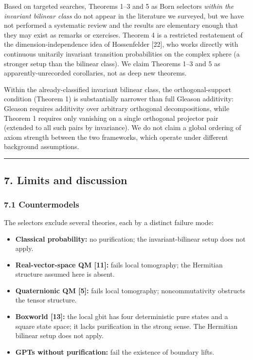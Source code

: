 \documentclass[
]{article}
\providecommand{\tightlist}{%
  \setlength{\itemsep}{0pt}\setlength{\parskip}{0pt}}
\begin{document}
Based on targeted searches, Theorems 1--3 and 5 as Born selectors
\emph{within the invariant bilinear class} do not appear in the
literature we surveyed, but we have not performed a systematic review
and the results are elementary enough that they may exist as remarks or
exercises. Theorem 4 is a restricted restatement of the
dimension-independence idea of Hossenfelder {[}22{]}, who works directly
with continuous unitarily invariant transition probabilities on the
complex sphere (a stronger setup than the bilinear class). We claim
Theorems 1--3 and 5 as apparently-unrecorded corollaries, not as deep
new theorems.

Within the already-classified invariant bilinear class, the
orthogonal-support condition (Theorem 1) is substantially narrower than
full Gleason additivity: Gleason requires additivity over arbitrary
orthogonal decompositions, while Theorem 1 requires only vanishing on a
single orthogonal projector pair (extended to all such pairs by
invariance). We do not claim a global ordering of axiom strength between
the two frameworks, which operate under different background
assumptions.

\begin{center}\rule{0.5\linewidth}{0.5pt}\end{center}

\subsection{7. Limits and discussion}\label{limits-and-discussion}

\subsubsection{7.1 Countermodels}\label{countermodels}

The selectors exclude several theories, each by a distinct failure mode:

\begin{itemize}
\tightlist
\item
  \textbf{Classical probability:} no purification; the
  invariant-bilinear setup does not apply.
\item
  \textbf{Real-vector-space QM {[}11{]}:} fails local tomography; the
  Hermitian structure assumed here is absent.
\item
  \textbf{Quaternionic QM {[}5{]}:} fails local tomography;
  noncommutativity obstructs the tensor structure.
\item
  \textbf{Boxworld {[}13{]}:} the local gbit has four deterministic pure
  states and a square state space; it lacks purification in the strong
  sense. The Hermitian bilinear setup does not apply.
\item
  \textbf{GPTs without purification:} fail the existence of boundary
  lifts.
\end{itemize}
\end{document}
